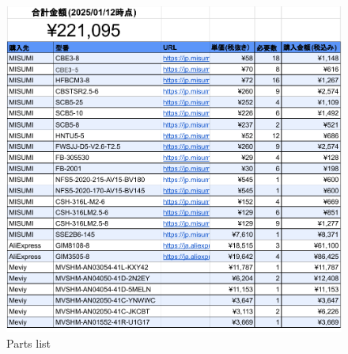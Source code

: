 \begin{figure}
  \includegraphics[width=14cm]{images/product/list.pdf}
  \caption{Parts list}
  \label{fig:parts}
\end{figure}
\clearpage
\newpage